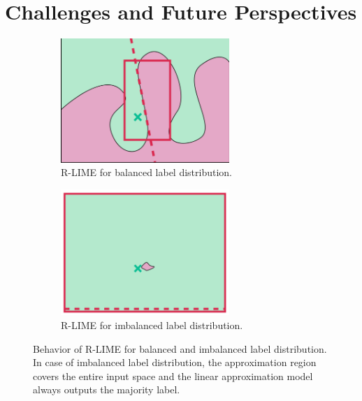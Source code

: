 \documentclass[11pt]{article}
\begin{document}
\section{Challenges and Future Perspectives}
 {%
  \def\imgwidth{0.45\textwidth}
  \begin{figure}[t]
	  \centering
	  \begin{subfigure}[t]{\imgwidth}
		  \centering
		  \includegraphics[width=0.7\textwidth]{newlime}
		  \caption{R-LIME for balanced label distribution.}\label{fig:balanced}
	  \end{subfigure}
	  \begin{subfigure}[t]{\imgwidth}
		  \centering
		  \includegraphics[width=0.7\textwidth]{newlime_for_imbalanced_data}
		  \caption{R-LIME for imbalanced label distribution.
		  }\label{fig:imbalanced}
	  \end{subfigure}
	  \caption[Behavior of R-LIME for balanced and imbalanced label distribution]{%
		  Behavior of R-LIME for balanced and imbalanced label distribution.
		  In case of imbalanced label distribution,
		  the approximation region covers the entire input space and the
		  linear approximation model always outputs the majority label.
	  }
  \end{figure}
 }
\end{document}

